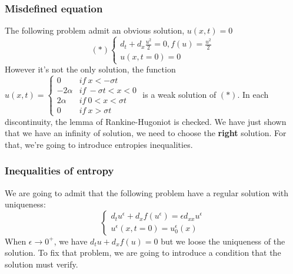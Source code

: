     \newpage
    
        \subsubsection{Misdefined equation}
            The following problem admit an obvious solution, $u\left(x,t\right) = 0$
            \begin{equation*}
                \left(*\right)
                \begin{cases}
                   d_t + d_x\frac{u^2}{2}=0, f\left(u\right)=\frac{u^2}{2} \\
                   u\left(x,t=0\right)=0
                \end{cases}
            \end{equation*}
            However it's not the only solution, the function $u\left(x,t\right) = 
                \begin{cases}
                    0        &if~x<-\sigma t \\
                    -2\alpha &if~-\sigma t<x<0 \\
                    2\alpha  &if~ 0<x<\sigma t\\
                    0        &if~x>\sigma t
                \end{cases}
                $
            is a weak solution of $\left(*\right)$. In each discontinuity, the lemma of Rankine-Hugoniot is checked.
            We have just shown that we have an infinity of solution, we need to choose the {\bf right} solution. For that, we're going to introduce entropies inequalities.
        
        \subsubsection{Inequalities of entropy}
            We are going to admit that the following problem have a regular solution with uniqueness: 
            \begin{equation}
                \begin{cases}
                    d_t u^\epsilon + d_x f\left(u^\epsilon\right) = \epsilon d_{xx}u^\epsilon \\
                    u^\epsilon\left(x,t=0\right) = u^\epsilon_0\left(x\right)
                \end{cases}
            \end{equation}
            When $\epsilon \to 0^+$, we have $d_t u + d_x f\left(u\right) = 0$ but we loose the uniqueness of the solution. To fix that problem, we are going to introduce a condition that the solution must verify. 
            
